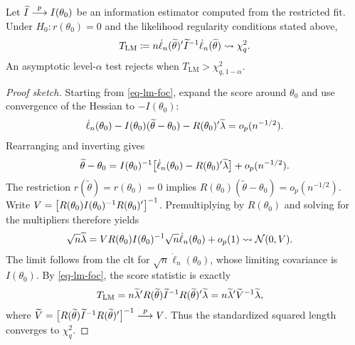 \documentclass[a4paper,12pt]{article}
\begin{document}
\begin{theorem}\label{thm-lm}
	Let $\widetilde I\overset{p}{\longrightarrow} I(\theta_0)$ be an information estimator computed from the restricted fit.
	Under $H_0:r(\theta_0)=0$ and the likelihood regularity conditions stated above,
	\begin{align}\label{eq-lm}
		T_{\mathrm{LM}}
		\coloneqq n\dot\ell_n(\widetilde\theta)^{\prime}\widetilde I^{-1}\dot\ell_n(\widetilde\theta)
		\overset{}{\leadsto}\chi_q^2.
	\end{align}
	An asymptotic level-$\alpha$ test rejects when $T_{\mathrm{LM}}>\chi^2_{q,1-\alpha}$.
\end{theorem}
\begin{proof}[Proof sketch]
	Starting from \eqref{eq-lm-foc}, expand the score around $\theta_0$ and use convergence of the Hessian to $-I(\theta_0)$:
	\begin{align*}
		\dot\ell_n(\theta_0)-I(\theta_0)(\widetilde\theta-\theta_0)
		-R(\theta_0)^{\prime}\widetilde\lambda=o_p(n^{-1/2}).
	\end{align*}
	Rearranging and inverting gives
	\begin{align}
		\widetilde\theta-\theta_0
		=I(\theta_0)^{-1}\big[\dot\ell_n(\theta_0)-R(\theta_0)^{\prime}\widetilde\lambda\big]+o_p(n^{-1/2}).
	\end{align}
	The restriction $r(\widetilde\theta)=r(\theta_0)=0$ implies
	$R(\theta_0)(\widetilde\theta-\theta_0)=o_p(n^{-1/2})$.
	Write $V=\big[R(\theta_0)I(\theta_0)^{-1} R(\theta_0)^{\prime}\big]^{-1}$.
	Premultiplying by $R(\theta_0)$ and solving for the multipliers therefore yields
	\begin{align}
		\sqrt n\widetilde\lambda
		&=V R(\theta_0)I(\theta_0)^{-1}\sqrt n\dot\ell_n(\theta_0)+o_p(1)
		\overset{}{\leadsto}\operatorname{\mathcal{N}}(0,V).
	\end{align}
	The limit follows from the \gls{clt} for $\sqrt n\dot\ell_n(\theta_0)$, whose limiting covariance is $I(\theta_0)$.
	By \eqref{eq-lm-foc}, the score statistic is exactly
	\begin{align*}
		T_{\mathrm{LM}}
		&=n\widetilde\lambda^{\prime} R(\widetilde\theta)\widetilde I^{-1} R(\widetilde\theta)^{\prime}\widetilde\lambda
		=n\widetilde\lambda^{\prime}\widetilde V^{-1}\widetilde\lambda,
	\end{align*}
	where $\widetilde V=\big[R(\widetilde\theta)\widetilde I^{-1} R(\widetilde\theta)^{\prime}\big]^{-1}\overset{p}{\longrightarrow} V$.
	Thus the standardized squared length converges to $\chi_q^2$.
\end{proof}
\end{document}
